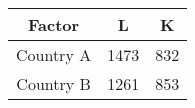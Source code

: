 \begin{table}[ht]
    \centering
    \begin{tabular}{|c|c|c|}
    \hline
    Factor & L & K \\
    \hline
    Country A & 1473 & 832 \\
    \hline
    Country B & 1261 & 853 \\
    \hline
    \end{tabular}
\end{table}